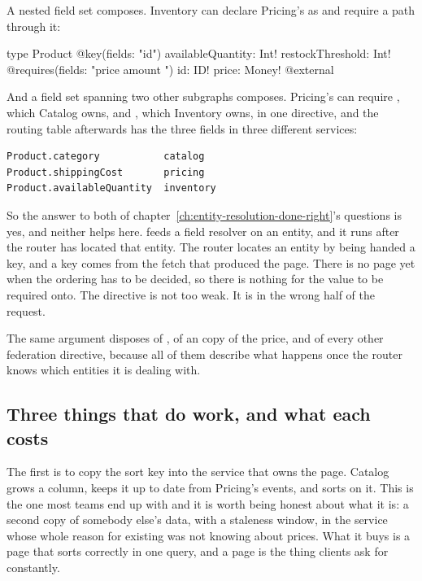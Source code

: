 A nested field set composes. Inventory can declare Pricing's  as
 and require a path through it:

\begin{graphqlsdl}[fontsize=\footnotesize]
type Product @key(fields: "id") {
  availableQuantity: Int!
  restockThreshold: Int! @requires(fields: "price { amount }")
  id: ID!
  price: Money! @external
}
\end{graphqlsdl}

%
And a field set spanning two other subgraphs composes. Pricing's
 can require , which Catalog owns, and
, which Inventory owns, in one directive, and the routing
table afterwards has the three fields in three different services:

\begin{verbatim}
Product.category           catalog
Product.shippingCost       pricing
Product.availableQuantity  inventory
\end{verbatim}

So the answer to both of chapter~\ref{ch:entity-resolution-done-right}'s
questions is yes, and neither helps here.  feeds a field
resolver on an entity, and it runs after the router has located that entity. The
router locates an entity by being handed a key, and a key comes from the fetch
that produced the page. There is no page yet when the ordering has to be decided,
so there is nothing for the value to be required onto. The directive is not too
weak. It is in the wrong half of the request.

The same argument disposes of , of an  copy of
the price, and of every other federation directive, because all of them describe
what happens once the router knows which entities it is dealing with.

\subsection*{Three things that do work, and what each costs}

%
The first is to copy the sort key into the service that owns the page. Catalog
grows a  column, keeps it up to date from Pricing's events,
and sorts on it. This is the one most teams end up with and it is worth being
honest about what it is: a second copy of somebody else's data, with a staleness
window, in the service whose whole reason for existing was not knowing about
prices. What it buys is a page that sorts correctly in one query, and a page is
the thing clients ask for constantly.


